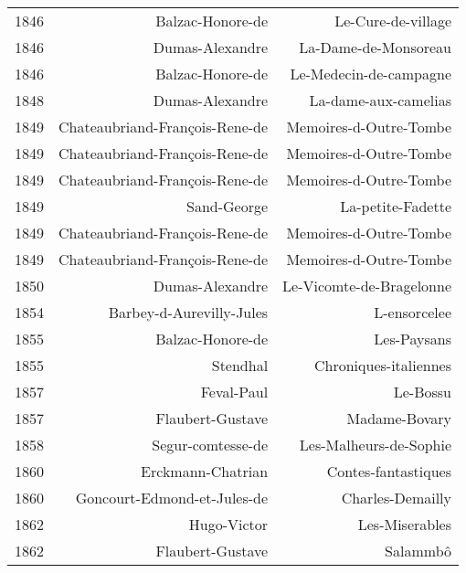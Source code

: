 \begin{xltabular}{\textwidth}{lrr}
1846 &                     Balzac-Honore-de &                    Le-Cure-de-village \\
1846 &                      Dumas-Alexandre &                  La-Dame-de-Monsoreau \\
1846 &                     Balzac-Honore-de &                Le-Medecin-de-campagne \\
1848 &                      Dumas-Alexandre &                  La-dame-aux-camelias \\
1849 &       Chateaubriand-François-Rene-de &                Memoires-d-Outre-Tombe \\
1849 &       Chateaubriand-François-Rene-de &                Memoires-d-Outre-Tombe \\
1849 &       Chateaubriand-François-Rene-de &                Memoires-d-Outre-Tombe \\
1849 &                          Sand-George &                     La-petite-Fadette \\
1849 &       Chateaubriand-François-Rene-de &                Memoires-d-Outre-Tombe \\
1849 &       Chateaubriand-François-Rene-de &                Memoires-d-Outre-Tombe \\
1850 &                      Dumas-Alexandre &              Le-Vicomte-de-Bragelonne \\
1854 &             Barbey-d-Aurevilly-Jules &                          L-ensorcelee \\
1855 &                     Balzac-Honore-de &                           Les-Paysans \\
1855 &                             Stendhal &                 Chroniques-italiennes \\
1857 &                           Feval-Paul &                              Le-Bossu \\
1857 &                     Flaubert-Gustave &                         Madame-Bovary \\
1858 &                    Segur-comtesse-de &                Les-Malheurs-de-Sophie \\
1860 &                    Erckmann-Chatrian &                   Contes-fantastiques \\
1860 &          Goncourt-Edmond-et-Jules-de &                      Charles-Demailly \\
1862 &                          Hugo-Victor &                        Les-Miserables \\
1862 &                     Flaubert-Gustave &               Salammbô \\ 

\end{xltabular}
